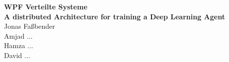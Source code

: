 \documentclass[12pt, twoside]{article}
\begin{document}
\begin{titlepage}
	\begin{center}
		{\Huge{\textbf{WPF Verteilte Systeme}}} \\
	\vspace{3cm}
		{\Huge{\textbf{A distributed Architecture for training
      a Deep Learning Agent}}} \\
	\vspace{2cm}
		\huge{Jonas Fa{\ss}bender} \\
	\vspace{.5cm}
		\huge{Amjad ...} \\
	\vspace{.5cm}
		\huge{Hamza ...} \\
	\vspace{.5cm}
		\huge{David ...}
	\end{center}
%
%
%
%
%
%
%
%
%
%
%
%
%
%
%
%
%
\end{titlepage}
\end{document}
